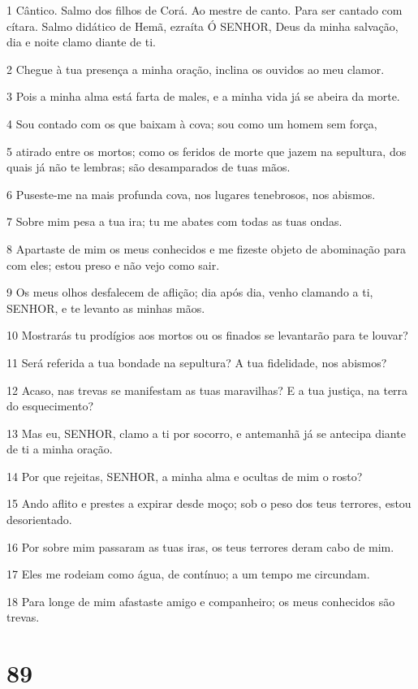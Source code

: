 \par 1 Cântico. Salmo dos filhos de Corá. Ao mestre de canto. Para ser cantado com cítara. Salmo didático de Hemã, ezraíta Ó SENHOR, Deus da minha salvação, dia e noite clamo diante de ti.
\par 2 Chegue à tua presença a minha oração, inclina os ouvidos ao meu clamor.
\par 3 Pois a minha alma está farta de males, e a minha vida já se abeira da morte.
\par 4 Sou contado com os que baixam à cova; sou como um homem sem força,
\par 5 atirado entre os mortos; como os feridos de morte que jazem na sepultura, dos quais já não te lembras; são desamparados de tuas mãos.
\par 6 Puseste-me na mais profunda cova, nos lugares tenebrosos, nos abismos.
\par 7 Sobre mim pesa a tua ira; tu me abates com todas as tuas ondas.
\par 8 Apartaste de mim os meus conhecidos e me fizeste objeto de abominação para com eles; estou preso e não vejo como sair.
\par 9 Os meus olhos desfalecem de aflição; dia após dia, venho clamando a ti, SENHOR, e te levanto as minhas mãos.
\par 10 Mostrarás tu prodígios aos mortos ou os finados se levantarão para te louvar?
\par 11 Será referida a tua bondade na sepultura? A tua fidelidade, nos abismos?
\par 12 Acaso, nas trevas se manifestam as tuas maravilhas? E a tua justiça, na terra do esquecimento?
\par 13 Mas eu, SENHOR, clamo a ti por socorro, e antemanhã já se antecipa diante de ti a minha oração.
\par 14 Por que rejeitas, SENHOR, a minha alma e ocultas de mim o rosto?
\par 15 Ando aflito e prestes a expirar desde moço; sob o peso dos teus terrores, estou desorientado.
\par 16 Por sobre mim passaram as tuas iras, os teus terrores deram cabo de mim.
\par 17 Eles me rodeiam como água, de contínuo; a um tempo me circundam.
\par 18 Para longe de mim afastaste amigo e companheiro; os meus conhecidos são trevas.

\chapter{89}

